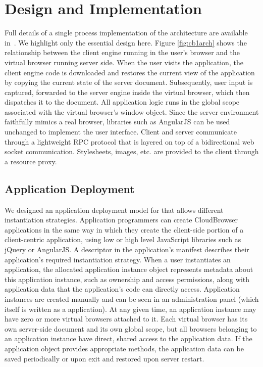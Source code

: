 \section{Design and Implementation}
\label{sec:implementation}

\architectureoverview{}

Full details of a single process implementation of the \cb architecture
are available in~\cite{mcdaniel2012cloudbrowser}.  We highlight only the
essential design here.  Figure \ref{fig:cb1arch} shows the relationship 
between the client engine running in the user's browser and the virtual browser
running server side.  When the user visits the application, the client engine
code is downloaded and restores the current view of the application by
copying the current state of the server document.  Subsequently, user input 
is captured, forwarded to the server engine inside the virtual browser, 
which then dispatches it to the document.  All application logic runs
in the global scope associated with the virtual browser's window object.
Since the server environment faithfully mimics a real browser, libraries
such as AngularJS can be used unchanged to implement the user interface.
Client and server communicate through a lightweight RPC protocol that is 
layered on top of a bidirectional web socket communication. 
Stylesheets, images, etc. are provided to the client through a resource
proxy.

\subsection{Application Deployment}

We designed an application deployment model for \cbtwo{} that allows different
instantiation strategies.
Application programmers can create CloudBrowser applications in the same way in which 
they create the client-side portion of a client-centric application, using low or high level
JavaScript libraries such as jQuery or AngularJS.  A descriptor in the application's
manifest describes their application's required instantiation strategy.
When a user instantiates an application, the allocated application instance object 
represents metadata about this application
instance, such as ownership and access permissions, along with application data that
the application's code can directly access.  Application instances are created manually
and can be seen in an administration panel (which itself is written as a \cb application).
At any given time, an application instance may have zero or more virtual browsers attached 
to it.  Each virtual browser has its own server-side document and its own global scope, 
but all browsers belonging to an application instance have direct, shared access to the 
application data.  If the application object provides appropriate methods, the application 
data can be saved periodically or upon exit and restored upon server restart.

